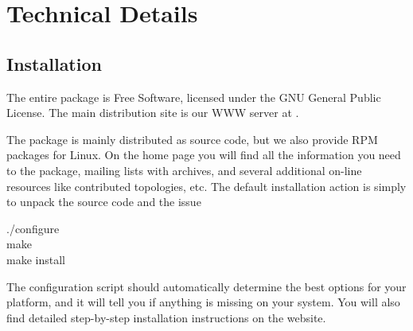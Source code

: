%
% 
% 
% 
% 
% 
% 
% 
% 
%

\chapter{Technical Details}
\label{ch:install}
\section{Installation}
The entire {\gromacs} package is Free Software, licensed under the GNU
General Public License. The main distribution site is our WWW server at
{\wwwpage}. 

The package is mainly distributed as source code, but we also provide
RPM packages for Linux.
On the home page you will find all the information you need to 
 the package, mailing lists with archives,
and several additional on-line resources like contributed topologies, etc.
The default installation action is simply to unpack the source code and
the issue\\
\begin{tt}
./configure\\
make\\
make install\\
\end{tt}
The configuration script should automatically determine the best options
for your platform, and it will tell you if anything is missing on
your system. You will also find detailed step-by-step installation
instructions on the website.

